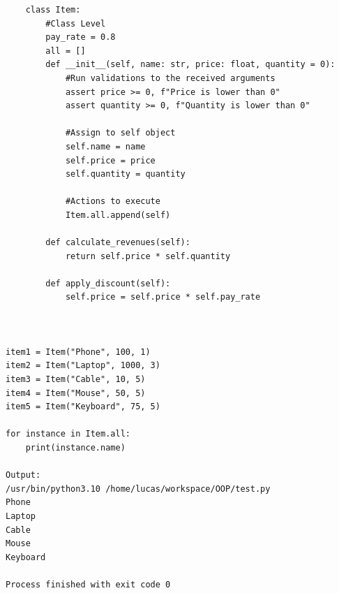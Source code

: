 \documentclass{article}
\begin{document}
\begin{lstlisting}
	class Item:
		#Class Level
		pay_rate = 0.8
		all = []
		def __init__(self, name: str, price: float, quantity = 0):
			#Run validations to the received arguments
			assert price >= 0, f"Price is lower than 0"
			assert quantity >= 0, f"Quantity is lower than 0"
			
			#Assign to self object
			self.name = name
			self.price = price
			self.quantity = quantity
			
			#Actions to execute
			Item.all.append(self)
			
		def calculate_revenues(self):
			return self.price * self.quantity
		
		def apply_discount(self):
			self.price = self.price * self.pay_rate
		
		
		
item1 = Item("Phone", 100, 1)
item2 = Item("Laptop", 1000, 3)
item3 = Item("Cable", 10, 5)
item4 = Item("Mouse", 50, 5)
item5 = Item("Keyboard", 75, 5)
		
for instance in Item.all:
	print(instance.name)	

Output:
/usr/bin/python3.10 /home/lucas/workspace/OOP/test.py 
Phone
Laptop
Cable
Mouse
Keyboard

Process finished with exit code 0	
	
\end{lstlisting}
\end{document}
